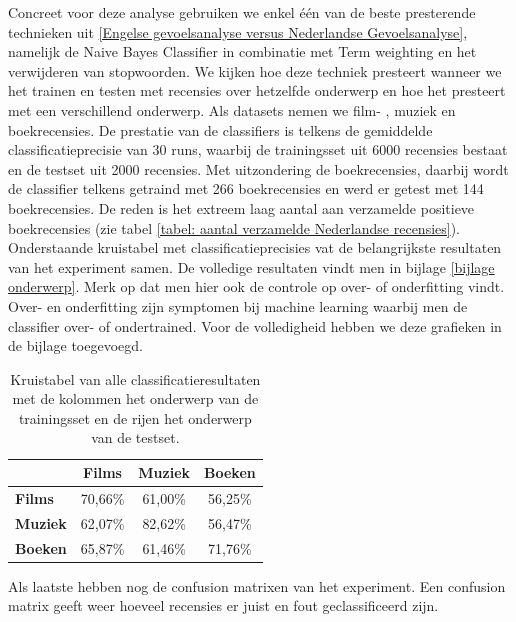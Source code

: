 Concreet voor deze analyse gebruiken we enkel \'{e}\'{e}n van de beste presterende technieken uit \ref{Engelse gevoelsanalyse versus Nederlandse Gevoelsanalyse}, namelijk de Naive Bayes Classifier in combinatie met Term weighting en het verwijderen van stopwoorden. We kijken hoe deze techniek presteert wanneer we het trainen en testen met recensies over hetzelfde onderwerp en hoe het presteert met een verschillend onderwerp.  Als datasets nemen we film- , muziek en boekrecensies. De prestatie van de classifiers is telkens de gemiddelde classificatieprecisie van 30 runs, waarbij de trainingsset uit 6000 recensies bestaat en de testset uit 2000 recensies. Met uitzondering de boekrecensies, daarbij wordt de classifier telkens getraind met 266 boekrecensies en werd er getest met 144 boekrecensies. De reden is het extreem laag aantal aan verzamelde positieve boekrecensies (zie tabel \ref{tabel: aantal verzamelde Nederlandse recensies}).\\


Onderstaande kruistabel met classificatieprecisies vat de belangrijkste resultaten van het experiment samen. De volledige resultaten vindt men in bijlage \ref{bijlage onderwerp}. Merk op dat men hier ook de controle op over- of onderfitting vindt. Over- en onderfitting zijn symptomen bij machine learning waarbij men de classifier over- of ondertrained. Voor de volledigheid hebben we deze grafieken in de bijlage toegevoegd.    

\begin{table}[h]
\centering
\begin{tabular}{l|c|c|c|}
\cline{2-4}
                                      & \textbf{Films} & \textbf{Muziek} & \textbf{Boeken} \\ \hline
\multicolumn{1}{|l|}{\textbf{Films}} & 70,66\%         & 61,00\%         & 56,25\%         \\ \hline
\multicolumn{1}{|l|}{\textbf{Muziek}} & 62,07\%         & 82,62\%         & 56,47\%         \\ \hline
\multicolumn{1}{|l|}{\textbf{Boeken}} & 65,87\%         & 61,46\%         & 71,76\%         \\ \hline
\end{tabular}
\label{tab:alles}
\caption{Kruistabel van alle classificatieresultaten met de kolommen het onderwerp van de trainingsset en de rijen het onderwerp van de testset.} 
\end{table}

Als laatste hebben nog de confusion matrixen van het experiment. Een confusion matrix geeft weer hoeveel recensies er juist en fout geclassificeerd zijn. 


